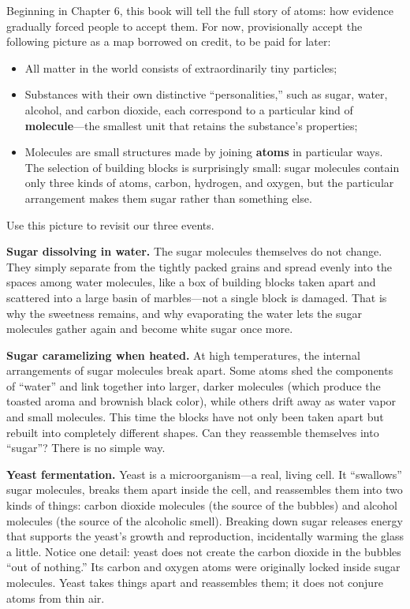 Beginning in Chapter 6, this book will tell the full story of atoms: how evidence gradually forced people to accept them. For now, provisionally accept the following picture as a map borrowed on credit, to be paid for later:

\begin{itemize}[itemsep=2pt]
\item All matter in the world consists of extraordinarily tiny particles;
\item Substances with their own distinctive ``personalities,'' such as sugar, water, alcohol, and carbon dioxide, each correspond to a particular kind of \textbf{molecule}---the smallest unit that retains the substance's properties;
\item Molecules are small structures made by joining \textbf{atoms} in particular ways. The selection of building blocks is surprisingly small: sugar molecules contain only three kinds of atoms, carbon, hydrogen, and oxygen, but the particular arrangement makes them sugar rather than something else.
\end{itemize}

Use this picture to revisit our three events.

\textbf{Sugar dissolving in water.} The sugar molecules themselves do not change. They simply separate from the tightly packed grains and spread evenly into the spaces among water molecules, like a box of building blocks taken apart and scattered into a large basin of marbles---not a single block is damaged. That is why the sweetness remains, and why evaporating the water lets the sugar molecules gather again and become white sugar once more.

\textbf{Sugar caramelizing when heated.} At high temperatures, the internal arrangements of sugar molecules break apart. Some atoms shed the components of ``water'' and link together into larger, darker molecules (which produce the toasted aroma and brownish black color), while others drift away as water vapor and small molecules. This time the blocks have not only been taken apart but rebuilt into completely different shapes. Can they reassemble themselves into ``sugar''? There is no simple way.

\textbf{Yeast fermentation.} Yeast is a microorganism---a real, living cell. It ``swallows'' sugar molecules, breaks them apart inside the cell, and reassembles them into two kinds of things: carbon dioxide molecules (the source of the bubbles) and alcohol molecules (the source of the alcoholic smell). Breaking down sugar releases energy that supports the yeast's growth and reproduction, incidentally warming the glass a little. Notice one detail: yeast does not create the carbon dioxide in the bubbles ``out of nothing.'' Its carbon and oxygen atoms were originally locked inside sugar molecules. Yeast takes things apart and reassembles them; it does not conjure atoms from thin air.


